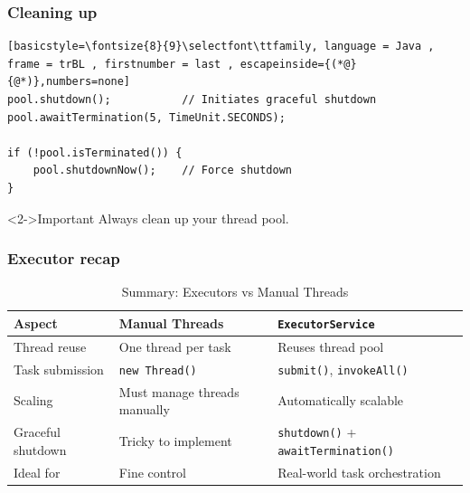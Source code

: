 \documentclass[xcolor={dvipsnames,svgnames},aspectratio=169]{beamer}
\begin{document}
\begin{frame}[fragile]
  \frametitle{Cleaning up}

\begin{lstlisting}[basicstyle=\fontsize{8}{9}\selectfont\ttfamily, language = Java ,
frame = trBL , firstnumber = last , escapeinside={(*@}{@*)},numbers=none]
pool.shutdown();           // Initiates graceful shutdown
pool.awaitTermination(5, TimeUnit.SECONDS);

if (!pool.isTerminated()) {
    pool.shutdownNow();    // Force shutdown
}
\end{lstlisting}

  \begin{block}<2->{\faLightbulb \quad Important}
    Always clean up your thread pool.
  \end{block}

\end{frame}

\begin{frame}[fragile]
  \frametitle{Executor recap}

  \begin{table}[h]
    \centering
    \begin{tabularx}{\textwidth}{|l|X|X|}
      \hline
      \textbf{Aspect} & Manual Threads & \texttt{ExecutorService} \\
      \hline
      Thread reuse & One thread per task & Reuses thread pool \\
      \hline
      Task submission & \texttt{new Thread()} & \texttt{submit()}, \texttt{invokeAll()} \\
      \hline
      Scaling & Must manage threads manually & Automatically scalable \\
      \hline
      Graceful shutdown & Tricky to implement & \texttt{shutdown()} + \texttt{awaitTermination()} \\
      \hline
      Ideal for & Fine control & Real-world task orchestration \\
      \hline
    \end{tabularx}
    \caption{Summary: Executors vs Manual Threads}
  \end{table}
\end{frame}
\end{document}
